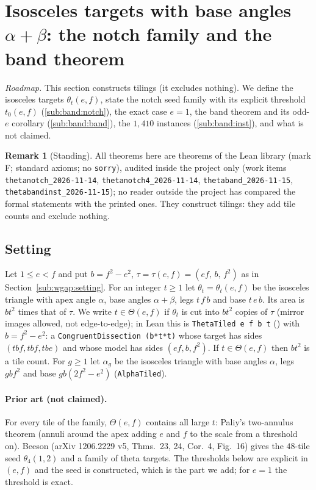 \documentclass[11pt,reqno]{amsart}
\theoremstyle{plain}
\theoremstyle{definition}
\newtheorem{remark}[theorem]{Remark}
\newcommand{\sF}{\textup{\textsf{F}}}
\newcommand{\rec}[1]{\textup{\texttt{#1}}}
\begin{document}
\section{Isosceles targets with base angles $\alpha+\beta$: the notch family and the band theorem}\label{sec:band}

\emph{Roadmap.} This section constructs tilings (it excludes nothing). We define the isosceles targets $\theta_t(e,f)$,
state the notch seed family with its explicit threshold $t_0(e,f)$ (\ref{sub:band:notch}), the exact case $e=1$,
the band theorem and its odd-$e$ corollary (\ref{sub:band:band}), the $1{,}410$ instances (\ref{sub:band:inst}), and what is not claimed.

\begin{remark}[Standing]\label{rem:band:status}
All theorems here are theorems of the Lean library (mark \sF; standard axioms; no \texttt{sorry}), audited
inside the project only (work items \rec{thetanotch\_2026-11-14}, \rec{thetanotch4\_2026-11-14},
\rec{thetaband\_2026-11-15}, \rec{thetabandinst\_2026-11-15}); no reader outside the project has compared the formal
statements with the printed ones. They construct tilings: they add tile counts and exclude nothing.
\end{remark}

\subsection{Setting}\label{sub:band:setting}
Let $1\le e<f$ and put $b=f^2-e^2$, $\tau=\tau(e,f)=(ef,\,b,\,f^2)$ as in Section~\ref{sub:wgap:setting}. For an integer $t\ge1$ let
$\theta_t=\theta_t(e,f)$ be the isosceles triangle with apex angle $\alpha$, base angles $\alpha+\beta$, legs $t\,f\,b$
and base $t\,e\,b$. Its area is $bt^2$ times that of $\tau$. We write $t\in\Theta(e,f)$ if $\theta_t$ is cut into
$bt^2$ copies of $\tau$ (mirror images allowed, not edge-to-edge); in Lean this is
\texttt{ThetaTiled e f b t} () with $b=f^2-e^2$: a \texttt{CongruentDissection (b*t*t)} whose
target has sides $(tbf,tbf,tbe)$ and whose model has sides $(ef,b,f^2)$. If $t\in\Theta(e,f)$ then $bt^2$ is a tile
count. For $g\ge1$ let $\alpha_g$ be the isosceles triangle with base angles $\alpha$, legs $gbf^2$ and base
$gb(2f^2-e^2)$ (\texttt{AlphaTiled}).

\paragraph{Prior art (not claimed).} For every tile of the family, $\Theta(e,f)$ contains all large $t$: Paliy's
two-annulus theorem (annuli around the apex adding $e$ and $f$ to the scale from a threshold on). Beeson
(arXiv 1206.2229 v5, Thms.~23, 24, Cor.~4, Fig.~16) gives the $48$-tile seed $\theta_4(1,2)$ and a family of
theta targets. The thresholds below are explicit in $(e,f)$ and the seed is constructed, which is the part we
add; for $e=1$ the threshold is exact.
\end{document}
